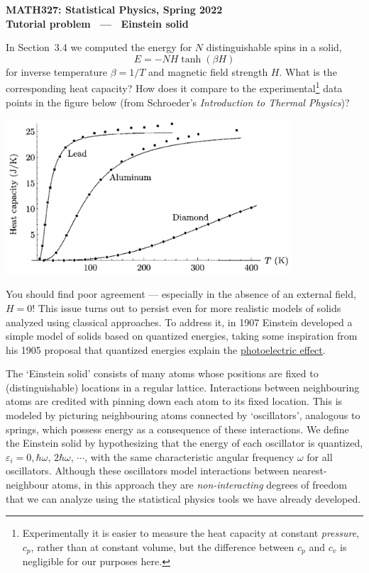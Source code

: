 \documentclass[12 pt]{article} %
\newcommand{\be}{\ensuremath{\beta} }
\newcommand{\eps}{\ensuremath{\varepsilon} }
\newcommand{\om}{\ensuremath{\omega} }
\begin{document}
\newcommand{\thisunit}{MATH327 Tutorial (Solid)}
\newcommand{\moddate}{Last modified 28 Mar.~2022}
\begin{center}
  {\Large \textbf{MATH327: Statistical Physics, Spring 2022}} \\[12 pt]
  {\Large \textbf{Tutorial problem \ --- \ Einstein solid}} \\[24 pt]
\end{center}

In Section~3.4 we computed the energy for $N$ distinguishable spins in a solid,
\begin{equation*}
  E = -NH\tanh(\be H)
\end{equation*}
for inverse temperature $\be = 1 / T$ and magnetic field strength $H$.
What is the corresponding heat capacity?
How does it compare to the experimental\footnote{Experimentally it is easier to measure the heat capacity at constant \textit{pressure}, $c_p$, rather than at constant volume, but the difference between $c_p$ and $c_v$ is negligible for our purposes here.} data points in the figure below (from Schroeder's \textit{Introduction to Thermal Physics})?

\begin{center}\includegraphics[width=0.8\textwidth]{figs/heat_cap.pdf}\end{center}

You should find poor agreement --- especially in the absence of an external field, $H = 0$!
This issue turns out to persist even for more realistic models of solids analyzed using classical approaches.
To address it, in 1907 Einstein developed a simple model of solids based on quantized energies, taking some inspiration from his 1905 proposal that quantized energies explain the \href{https://en.wikipedia.org/wiki/Photoelectric_effect}{photoelectric effect}.

The `Einstein solid' consists of many atoms whose positions are fixed to (distinguishable) locations in a regular lattice.
Interactions between neighbouring atoms are credited with pinning down each atom to its fixed location.
This is modeled by picturing neighbouring atoms connected by `oscillators', analogous to springs, which possess energy as a consequence of these interactions.
We define the Einstein solid by hypothesizing that the energy of each oscillator is quantized, $\eps_i = 0, \hbar \om$, $2\hbar \om$, $\cdots$, with the same characteristic angular frequency \om for all oscillators.
Although these oscillators model interactions between nearest-neighbour atoms, in this approach they are \textit{non-interacting} degrees of freedom that we can analyze using the statistical physics tools we have already developed.
\end{document}
